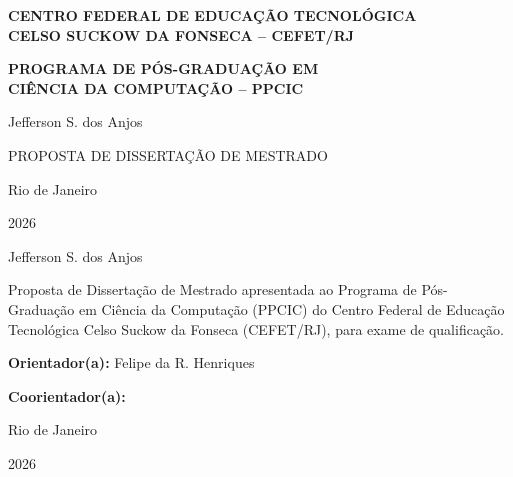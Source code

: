 
\newcommand{\autorqualificacao}{Jefferson S. dos Anjos}
\newcommand{\orientadorqualificacao}{Felipe da R. Henriques}
\newcommand{\coorientadorqualificacao}{}
\newcommand{\cidadequalificacao}{Rio de Janeiro}
\newcommand{\anoqualificacao}{2026}

\thispagestyle{empty}
\begin{center}
{\bfseries CENTRO FEDERAL DE EDUCAÇÃO TECNOLÓGICA\\[0.2cm]
CELSO SUCKOW DA FONSECA -- CEFET/RJ\par}
\vspace{0.55cm}
{\bfseries PROGRAMA DE PÓS-GRADUAÇÃO EM\\
CIÊNCIA DA COMPUTAÇÃO -- PPCIC\par}

\vspace{3.6cm}
{\large\autorqualificacao\par}

\vfill
{\bfseries\large\MakeUppercase{\tituloqualificacao}\par}

\vfill
{\large PROPOSTA DE DISSERTAÇÃO DE MESTRADO\par}

\vspace{2.1cm}
{\cidadequalificacao\par}
{\anoqualificacao\par}
\end{center}
\clearpage

\setcounter{page}{1}
\thispagestyle{empty}
\begin{center}
{\large\autorqualificacao\par}

\vspace{3.0cm}
{\bfseries\large\MakeUppercase{\tituloqualificacao}\par}
\end{center}

\vspace{3.0cm}
\hspace*{0.39\textwidth}%
\begin{minipage}{0.61\textwidth}
\small\noindent
Proposta de Dissertação de Mestrado apresentada ao Programa de Pós-Graduação
em Ciência da Computação (PPCIC) do Centro Federal de Educação Tecnológica
Celso Suckow da Fonseca (CEFET/RJ), para exame de qualificação.

\medskip
\noindent\textbf{Orientador(a):} \orientadorqualificacao

\ifx\coorientadorqualificacao\empty\else
\medskip
\noindent\textbf{Coorientador(a):} \coorientadorqualificacao
\fi
\end{minipage}

\vfill
\begin{center}
{\cidadequalificacao\par}
{\anoqualificacao\par}
\end{center}
\clearpage
